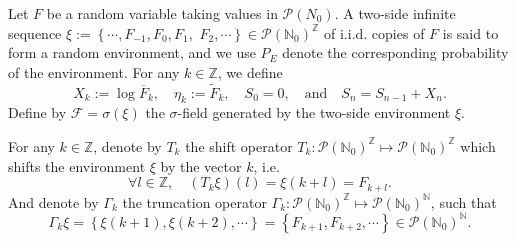 \documentclass[]{article}
\numberwithin{equation}{section}
\theoremstyle{thmstyleone}%
\theoremstyle{thmstyletwo}%
\theoremstyle{thmstylethree}%
\theoremstyle{thmstylefour}%
\theoremstyle{thmstylefive}%
\theoremstyle{thmstylesix}%
\newcommand{\N}{\mathbb{N}}
\begin{document}
	Let $F$ be a random variable 
	taking values in $\mathcal{P}\left(N_0\right)$. A two-side infinite sequence $\xi:= \left\{\cdots, F_{-1},F_{0},F_1,\right.$ $\left.F_2,\cdots\right\}\in \mathcal{P}\left(\N_0\right)^{\mathbb{Z}} $
	of i.i.d. copies of $F$ is said to form a random environment, and we use $P_E$ denote the corresponding probability of the environment.
	For any $k \in \mathbb{Z}$, we define
	\begin{equation}\label{quenched random walk}
		X_k:=\log \overline{F}_k,\quad \eta_k:=\tilde{F}_k,
		\quad S_0=0,\quad \text{and} \quad S_n=S_{n-1}+X_n.
	\end{equation}
	Define by $ \mathcal{F} = \sigma(\xi) $ the $\sigma$-field generated by the two-side environment $\xi$.
	
	
	For any $k\in \mathbb{Z}$, denote by $ T_k $ the shift operator $T_k:\mathcal{P}\left(\N_0\right)^{\mathbb{Z}} \longmapsto \mathcal{P}\left(\N_0\right)^{\mathbb{Z}} $ which shifts the environment $\xi$ by the vector $k$, i.e.
	\begin{equation}\label{shift operator}
		\forall l\in \mathbb{Z}, \quad (T_k\xi)(l) = \xi(k+l) = F_{k+l}.
	\end{equation}
	And denote by $\Gamma_k $ the truncation operator $\Gamma_k:\mathcal{P}\left(\N_0\right)^{\mathbb{Z}} \longmapsto \mathcal{P}\left(\N_0\right)^{\mathbb{N}} $, such that
	\begin{equation}\label{cut off operator}
		\Gamma_k\xi = 
		\left\{
		\xi(k+1),\xi(k+2),\cdots
		\right\}
		=
		\left\{F_{k+1},F_{k+2},\cdots
		\right\} \in \mathcal{P}\left(\N_0\right)^{\mathbb{N}}.
	\end{equation}
	
\end{document}
